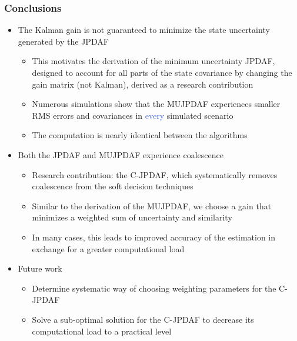 \documentclass[hyperref={pdftex,pdfpagemode=none,pdfstartview=FitH},10pt]{beamer}
\def\Emph{\textcolor{RoyalBlue}}
\begin{document}
\begin{frame}
\frametitle{Conclusions}

\begin{itemize}
\item The Kalman gain is not guaranteed to minimize the state uncertainty generated by the JPDAF
\begin{itemize}
\item This motivates the derivation of the minimum uncertainty JPDAF, designed to account for all parts of the state covariance by changing the gain matrix (not Kalman), derived as a research contribution
\item Numerous simulations show that the MUJPDAF experiences smaller RMS errors and covariances in \Emph{every} simulated scenario
\item The computation is nearly identical between the algorithms
\end{itemize}
\item Both the JPDAF and MUJPDAF experience coalescence
\begin{itemize}
\item Research contribution: the C-JPDAF, which systematically removes coalescence from the soft decision techniques
\item Similar to the derivation of the MUJPDAF, we choose a gain that minimizes a weighted sum of uncertainty and similarity
\item In many cases, this leads to improved accuracy of the estimation in exchange for a greater computational load
\end{itemize}
\item Future work
\begin{itemize}
\item Determine systematic way of choosing weighting parameters for the C-JPDAF
\item Solve a sub-optimal solution for the C-JPDAF to decrease its computational load to a practical level
\end{itemize}
\end{itemize}

\end{frame}
\end{document}
